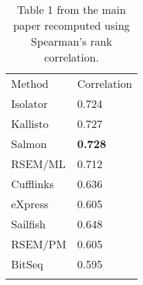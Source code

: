 \documentclass{article}
\begin{document}
\begin{table}
\begin{center}
\label{table:rlsim:spearman}
\begin{tabular}[c]{@{}ll@{}}
\toprule\addlinespace
Method & Correlation
\\\addlinespace
\midrule
Isolator   & 0.724
\\\addlinespace
Kallisto   & 0.727
\\\addlinespace
Salmon     & \textbf{0.728}
\\\addlinespace
RSEM/ML    & 0.712
\\\addlinespace
Cufflinks  & 0.636
\\\addlinespace
eXpress    & 0.605
\\\addlinespace
Sailfish   & 0.648
\\\addlinespace
RSEM/PM    & 0.605
\\\addlinespace
BitSeq     & 0.595
\\\addlinespace
\bottomrule
\addlinespace
\end{tabular}
\caption{Table 1 from the main paper recomputed using Spearman's rank correlation.}
\end{center}
\end{table}



\end{document}
